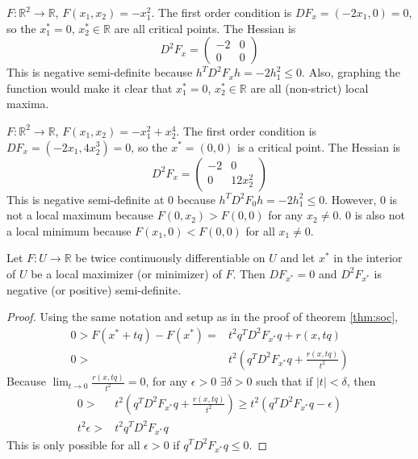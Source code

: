 \documentclass[compress]{beamer}
\def\R{\mathbb{R}}
\renewcommand{\to}{{\rightarrow}}
\begin{document}
\begin{frame}
  \begin{example}
    $F: \R^2 \to \R$, $F(x_1,x_2) = -x_1^2$. The first order condition is
    $DF_x = (-2x_1,0) = 0$, so the $x_1^*=0$, $x_2^* \in \R$ are all
    critical points. The Hessian is
    \[ D^2 F_x = \begin{pmatrix} -2 & 0 \\
      0 & 0 \end{pmatrix} \]
    This is negative semi-definite because $h^T D^2 F_x h = -2 h_1^2
    \leq 0$. Also, graphing the function would make it clear that
    $x_1^*=0$, $x_2^* \in \R$ are all (non-strict) local maxima. 
  \end{example}
\end{frame}

\begin{frame}
  \begin{example}
    $F: \R^2 \to \R$, $F(x_1,x_2) = -x_1^2 + x_2^4$. The first order
    condition is $DF_x = (-2x_1,4 x_2^3) = 0$, so the $x^* = (0,0)$ is a
    critical point. The Hessian is  
    \[ D^2 F_x = \begin{pmatrix} -2 & 0 \\
      0 & 12 x_2^2 \end{pmatrix} \]
    This is negative semi-definite at $0$ because $h^T D^2 F_0 h = -2 h_1^2
    \leq 0$. However, $0$ is not a local maximum because $F(0,x_2)>
    F(0,0)$ for any $x_2 \neq 0$. $0$ is also not a local minimum
    because $F(x_1,0) < F(0,0)$ for all $x_1 \neq 0$.
  \end{example}
\end{frame}

\begin{frame}
  \begin{theorem}
    Let $F: U \to \R$ be twice continuously differentiable on $U$ and
    let $x^*$ in the interior of $U$ be a local maximizer (or minimizer) of
    $F$. Then $DF_{x^*} = 0$ and $D^2 F_{x^*}$ is negative (or positive)
    semi-definite. 
  \end{theorem}
  \begin{proof}
    Using the same notation and setup as in the proof of theorem
    \ref{thm:soc}, 
    \begin{align*}
      0 > F(x^* + tq ) - F(x^*) = & t^2 q^T D^2 F_{x^*} q + r(x,tq)  \\
      0 >  & t^2\left(q^T D^2 F_{x^*} q + \frac{r(x,tq)}{t^2} \right) 
    \end{align*}
    Because $\lim_{t \to 0} \frac{r(x,tq)}{t^2} = 0$, for any $\epsilon
    >0$ $\exists \delta > 0$ such that if $|t|< \delta$, then
    \begin{align*}
      0 > & t^2\left(q^T D^2 F_{x^*} q + \frac{r(x,tq)}{t^2} \right) \geq  t^2
      \left(q^T D^2 F_{x^*} q - \epsilon \right) \\
      t^2 \epsilon >& t^2 q^T D^2 F_{x^*} q 
    \end{align*}
    This is only possible for all $\epsilon >0$ if $q^T D^2 F_{x^*}
    q\leq 0$. 
  \end{proof}
\end{frame}
\end{document}

